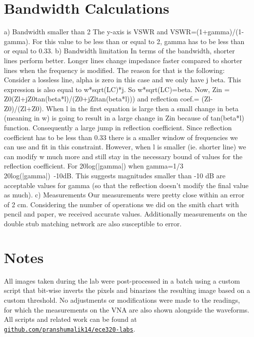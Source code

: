 \documentclass[10pt]{article}
\begin{document}
\section{Bandwidth Calculations}

a)  Bandwidth smaller than 2
    The y-axis is VSWR and VSWR=(1+gamma)/(1-gamma). For this value to be less than or equal to 2, gamma has to be
    less than or equal to 0.33. 
b)  Bandwidth limitation
    In terms of the bandwidth, shorter lines perform better. Longer lines change impedance faster compared
    to shorter lines when the frequency is modified. The reason for that is the following:
    Consider a lossless line, alpha is zero in this case and we only have j beta. This expression is also 
    equal to w*sqrt(LC)*j. So w*sqrt(LC)=beta. Now, Zin = Z0(Zl+jZ0tan(beta*l)/(Z0+jZltan(beta*l))) and
    reflection coef.= (Zl-Z0)/(Zl+Z0). When l in the first equation is large then a small change in beta (meaning in w)
    is going to result in a large change in Zin because of tan(beta*l) function. Consequently a large jump in reflection coefficient. 
    Since reflection coefficient has to be less than 0.33 there is a smaller window of frequencies we can use
    and fit in this constraint. However, when l is smaller (ie. shorter line) we can modify w much more and
    still stay in the necessary bound of values for the reflection coefficient. 
    For 20log(|gamma|) when gamma=1/3 20log(|gamma|)~-10dB. This suggests magnitudes smaller than -10 dB are 
    acceptable values for gamma (so that the reflection doesn't modify the final value as much).
c)  Measurements
    Our measurements were pretty close within an error of 2 cm. Considering the number of operations we did
    on the smith chart with pencil and paper, we received accurate values. Additionally measurements on 
    the double stub matching network are also susceptible to error.

\section{Notes}

All images taken during the lab were post-processed in a batch using a custom script
that bit-wise inverts the pixels and binarizes the resulting image based on a custom threshold.
No adjustments or modifications were made to the readings, for which the measurements on the VNA
are also shown alongside the waveforms. All scripts and related work can be found at 
\href{https://github.com/pranshumalik14/ece320-labs}{\texttt{github.com/pranshumalik14/ece320-labs}}.
\end{document}

